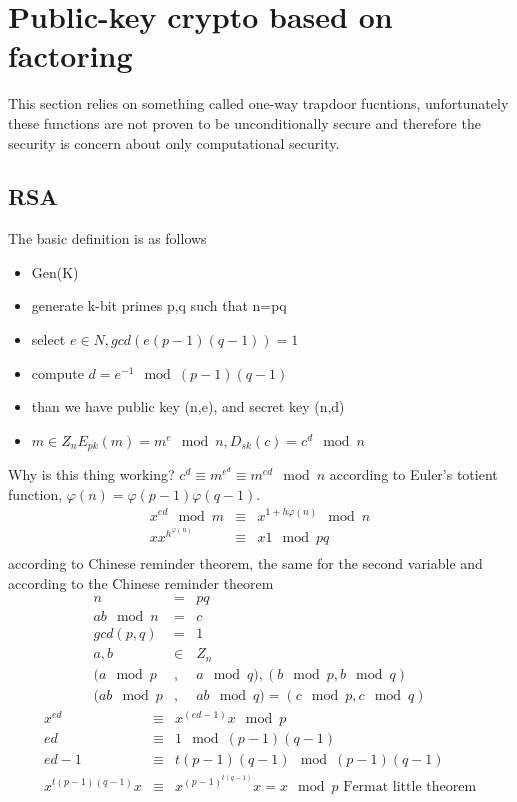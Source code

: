 \documentclass[a4paper,10pt]{article}
\begin{document}
\section*{Public-key crypto based on factoring}
This section relies on something called one-way trapdoor fucntions, unfortunately these functions are not proven to be unconditionally secure and therefore the security is concern about only computational security.
\subsection*{RSA}
The basic definition is as follows
\begin{itemize}
\item Gen(K)
\item generate k-bit primes p,q such that n=pq
\item select $e \in N, gcd(e(p-1)(q-1))=1$
\item compute $d = e^{-1} \mod (p-1)(q-1)$
\item than we have public key (n,e), and secret key (n,d)
\item $m \in Z_n E_{pk}(m) = m^e \mod n, D_{sk}(c) = c^d \mod n$
\end{itemize}
Why is this thing working? $c^d \equiv m^{e^d} \equiv m^{ed} \mod n$  according to Euler's totient function, $\varphi(n) = \varphi(p-1)\varphi(q-1)$.
\begin{eqnarray*}
x^{ed} \mod m &\equiv & x^{1 + h\varphi(n)} \mod n\\
x x^{h^{\varphi(n)}} & \equiv & x1 \mod pq\\
\end{eqnarray*}
according to Chinese reminder theorem, the same for the second variable and according to the Chinese reminder theorem 
\begin{eqnarray*}
n &=& pq\\
ab \mod n &=& c\\
gcd(p,q) &=& 1\\
a,b &\in & Z_n\\
(a \mod p&,&a \mod q),(b \mod p,b \mod q)\\
(ab \mod p&,&ab \mod q) = (c \mod p, c \mod q)
\end{eqnarray*}
\begin{eqnarray*}
x^{ed} & \equiv & x^{(ed-1)}x \mod p\\
ed &\equiv & 1 \mod(p-1)(q-1)\\
ed - 1 &\equiv & t(p-1)(q-1) \mod (p-1)(q-1)\\
x^{t(p-1)(q-1)}x & \equiv &  x^{(p-1)^{t(q-1)}}x = x\mod p \text{ Fermat little theorem}\\
\end{eqnarray*}
\end{document}
